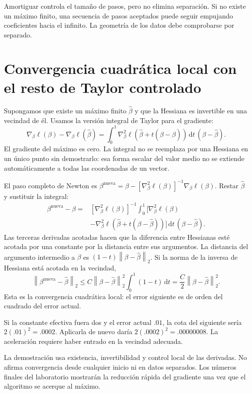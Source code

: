 \documentclass[11pt,a4paper]{article}
\newcommand{\dd}{\,\mathrm d}
\newcommand{\norm}[1]{\left\lVert #1\right\rVert}
\begin{document}
Amortiguar controla el tamaño de pasos, pero no elimina separación.
Si no existe un máximo finito, una secuencia de pasos aceptados puede
seguir empujando coeficientes hacia el infinito.
La geometría de los datos debe comprobarse por separado.

\clearpage
\section{Convergencia cuadrática local con el resto de Taylor controlado}\label{logit46}
Supongamos que existe un máximo finito $\widehat\beta$ y que la Hessiana
es invertible en una vecindad de él.
Usamos la versión integral de Taylor para el gradiente:
\[
\nabla_\beta\ell(\beta)-\nabla_\beta\ell(\widehat\beta)
=\int_0^1\nabla_\beta^2\ell(
\widehat\beta+t(\beta-\widehat\beta))\dd t\,
(\beta-\widehat\beta).
\]
El gradiente del máximo es cero.
La integral no se reemplaza por una Hessiana en un único punto
sin demostrarlo: esa forma escalar del valor medio no se extiende
automáticamente a todas las coordenadas de un vector.

El paso completo de Newton es
$\beta^{\mathrm{nueva}}=\beta-
[\nabla_\beta^2\ell(\beta)]^{-1}\nabla_\beta\ell(\beta)$.
Restar $\widehat\beta$ y sustituir la integral:
\[
\begin{aligned}
\beta^{\mathrm{nueva}}-\widehat\beta
={}&[\nabla_\beta^2\ell(\beta)]^{-1}
\int_0^1\Big[
\nabla_\beta^2\ell(\beta)\\
&-\nabla_\beta^2\ell(
\widehat\beta+t(\beta-\widehat\beta))
\Big]\dd t\,(\beta-\widehat\beta).
\end{aligned}
\]
Las terceras derivadas acotadas hacen que la diferencia entre
Hessianas esté acotada por una constante por la distancia entre
sus argumentos.
La distancia del argumento intermedio a $\beta$ es
$(1-t)\norm{\beta-\widehat\beta}_2$.
Si la norma de la inversa de Hessiana está acotada en la vecindad,
\[
\norm{\beta^{\mathrm{nueva}}-\widehat\beta}_2
\le C\norm{\beta-\widehat\beta}_2^2\int_0^1(1-t)\dd t
=\frac C2\norm{\beta-\widehat\beta}_2^2.
\]
Esta es la convergencia cuadrática local: el error siguiente es
de orden del cuadrado del error actual.

\begin{ejemplo}
Si la constante efectiva fuera dos y el error actual $.01$,
la cota del siguiente sería $2(.01)^2=.0002$.
Aplicarla de nuevo daría $2(.0002)^2=.00000008$.
La aceleración requiere haber entrado en la vecindad adecuada.
\end{ejemplo}
La demostración usa existencia, invertibilidad y control local
de las derivadas.
No afirma convergencia desde cualquier inicio ni en datos separados.
Los números finales del laboratorio mostrarán la reducción rápida
del gradiente una vez que el algoritmo se acerque al máximo.
\end{document}
